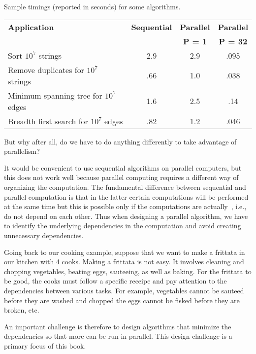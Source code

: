 Sample timings (reported in seconds) for some algorithms.
  \begin{center}
  \begin{tabular}{l  c c c}
    \toprule
    \textbf{Application} & \textbf{Sequential} & \textbf{Parallel} &
    \textbf{Parallel}
\\
     & & \textbf{P = 1} & \textbf{P = 32}
\\
    \midrule
    Sort $10^7$ strings &        2.9 &  2.9 &  .095\\
    Remove duplicates for $10^7$ strings &      .66 &  1.0 & .038\\
    Minimum spanning tree for $10^7$ edges    &    1.6 & 2.5  & .14\\
    Breadth first search for $10^7$ edges  &   .82  & 1.2 &  .046\\
    \bottomrule
  \end{tabular}
  \end{center}

But why after all, do we have to do anything differently to take
advantage of parallelism?  

It would be convenient to use sequential algorithms on parallel
computers, but this does not work well because parallel computing
requires a different way of organizing the computation.
%
The fundamental difference between sequential and parallel computation
is that in the latter certain computations will be performed at the
same time but this is possible only if the computations are actually~, i.e., do not depend on each other.
%
Thus when designing a parallel algorithm, we have to identify the
underlying dependencies in the computation and avoid creating
unnecessary dependencies.

Going back to our cooking example, suppose that we want to make a
frittata in our kitchen with 4 cooks.
%
Making a frittata is not easy.
%
It involves cleaning and chopping vegetables, beating eggs,
sauteeing, as well as baking.
%
For the frittata to be good, the cooks must follow a specific receipe
and pay attention to the dependencies between various tasks.
%
For example,
%
vegetables cannot be sauteed before they are washed and chopped
%
the eggs cannot be fisked before they are broken, etc.
%

An important challenge is therefore to design algorithms that minimize
the dependencies so that more can be run in parallel.
%
This design challenge is a primary focus of this book. 

